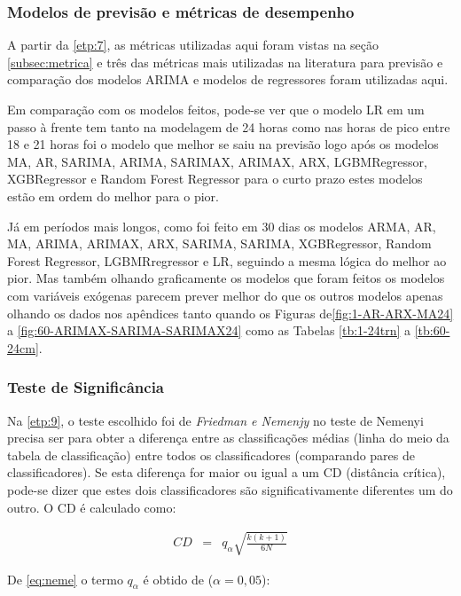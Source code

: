 \subsubsection{Modelos de previs\~ao e m\'etricas de desempenho}\label{subsubsec:modelos}

A partir da \ref{etp:7}, as métricas utilizadas aqui foram vistas na seção \ref{subsec:metrica} e três das métricas mais utilizadas na literatura para previsão e comparação dos modelos ARIMA e modelos de regressores foram utilizadas aqui.

 Em comparação com os modelos feitos, pode-se ver que o modelo LR em um passo à frente tem tanto na modelagem de 24 horas como nas horas de pico entre 18 e 21 horas foi o modelo que melhor se saiu na previsão logo após os modelos MA, AR, SARIMA, ARIMA, SARIMAX, ARIMAX, ARX, LGBMRegressor, XGBRegressor e Random Forest Regressor para o curto prazo estes modelos estão em ordem do melhor para o pior.

   Já em períodos mais longos, como foi feito em 30 dias os modelos ARMA, AR, MA, ARIMA, ARIMAX, ARX, SARIMA, SARIMA, XGBRegressor, Random Forest Regressor, LGBMRregressor e LR, seguindo a mesma lógica do melhor ao pior. Mas também olhando graficamente os modelos que foram feitos os modelos com variáveis exógenas parecem prever melhor do que os outros modelos apenas olhando os dados nos apêndices tanto quando os Figuras de\ref{fig:1-AR-ARX-MA24} a \ref{fig:60-ARIMAX-SARIMA-SARIMAX24} como as Tabelas \ref{tb:1-24trn} a \ref{tb:60-24cm}.   
    
  
    \subsubsection{Teste de Signific\^ancia}
    
 Na \ref{etp:9}, o teste escolhido foi de \textit{Friedman e Nemenjy} no teste de Nemenyi precisa ser para obter a diferença entre as classificações médias (linha do meio da tabela de classificação) entre todos os classificadores (comparando pares de classificadores). Se esta diferença for maior ou igual a um CD (distância crítica), pode-se dizer que estes dois classificadores são significativamente diferentes um do outro. O CD é calculado como:
    
    
    \begin{eqnarray}
    	C D&=&q_\alpha \sqrt{\frac{k(k+1)}{6 N}}\label{eq:neme}
    \end{eqnarray}

De \eqref{eq:neme} o termo $q_\alpha$ é obtido de ($\alpha=0,05$):

